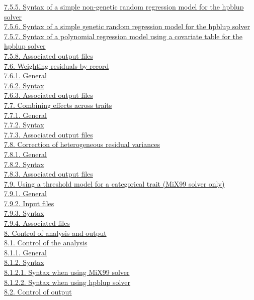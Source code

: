 \hyperref[Stat25]{7.5.5. Syntax of a simple non-genetic random
regression model for the hpblup solver}\\
\hyperref[Stat26]{7.5.6. Syntax of a simple genetic random regression
model for the hpblup solver}\\
\hyperref[Stat27]{7.5.7. Syntax of a polynomial regression model using a
covariate table for the hpblup solver}\\
\hyperref[Stat28]{7.5.8. Associated output files}\\
\hyperref[Stat29]{7.6. Weighting residuals by record}\\
\hyperref[Stat30]{7.6.1. General}\\
\hyperref[Stat31]{7.6.2. Syntax}\\
\hyperref[Stat32]{7.6.3. Associated output files}\\
\hyperref[Stat33]{7.7. Combining effects across traits}\\
\hyperref[Stat34]{7.7.1. General}\\
\hyperref[Stat35]{7.7.2. Syntax}\\
\hyperref[Stat36]{7.7.3. Associated output files}\\
\hyperref[Stat37]{7.8. Correction of heterogeneous residual variances}\\
\hyperref[Stat38]{7.8.1. General}\\
\hyperref[Stat39]{7.8.2. Syntax}\\
\hyperref[Stat40]{7.8.3. Associated output files}\\
\hyperref[Stat41]{7.9. Using a threshold model for a categorical trait
(MiX99 solver only)}\\
\hyperref[Stat42]{7.9.1. General}\\
\hyperref[Stat43]{7.9.2. Input files}\\
\hyperref[Stat44]{7.9.3. Syntax}\\
\hyperref[Stat45]{7.9.4. Associated files}\\
\hyperref[Cont01]{8. Control of analysis and output}\\
\hyperref[Cont02]{8.1. Control of the analysis}\\
\hyperref[Cont03]{8.1.1. General}\\
\hyperref[Cont04]{8.1.2. Syntax}\\
\hyperref[Cont05]{8.1.2.1. Syntax when using MiX99 solver}\\
\hyperref[Cont06]{8.1.2.2. Syntax when using hpblup solver}\\
\hyperref[Cont07]{8.2. Control of output}\\

